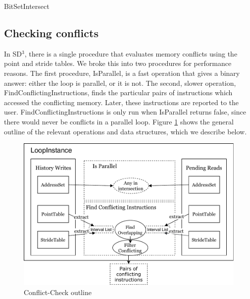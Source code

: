 \documentclass[12pt,twoside]{reedthesis}
\begin{document}
			\begin{algorithm}
				\caption{BitSetIntersect}
				\label{bitsetintersect}
				\begin{algorithmic}[1]
					\Else
					\EndIf
					\EndFor
					
					\EndFunction
				\end{algorithmic}
			\end{algorithm}
		
		\subsection{Checking conflicts}
			
			In SD$^3$, there is a single procedure that evaluates memory conflicts using the point and stride tables. We broke this into two procedures for performance reasons.  The first procedure, IsParallel, is a fast operation that gives a binary answer: either the loop is parallel, or it is not. The second, slower operation, FindConflictingInstructions, finds the particular pairs of instructions which accessed the conflicting memory. Later, these instructions are reported to the user. FindConflictingInstructions is only run when IsParallel returns false, since there would never be conflicts in a parallel loop. Figure \ref{fig:conflict-check} shows the general outline of the relevant operations and data structures, which we describe below. 
			
			\begin{figure}
				\caption{Conflict-Check outline}
				\label{fig:conflict-check}
				\includegraphics[scale=0.9]{conflict-diagram-output.pdf}
			\end{figure}
		
\end{document}
